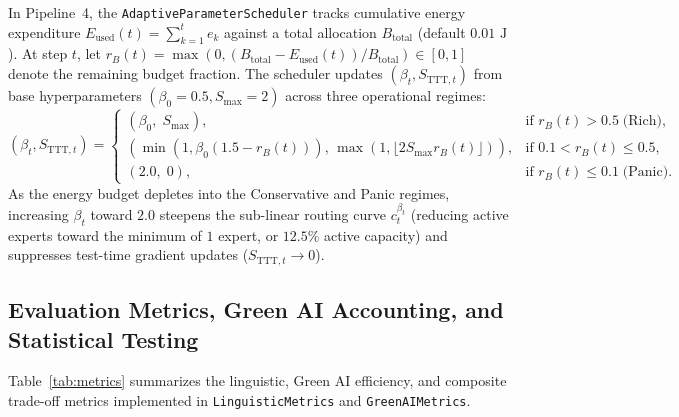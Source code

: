 \documentclass{interact}
\begin{document}
In Pipeline~4, the \texttt{AdaptiveParameterScheduler} tracks cumulative energy expenditure $E_{\text{used}}(t) = \sum_{k=1}^{t} e_k$ against a total allocation $B_{\text{total}}$ (default $0.01\text{ J}$). At step $t$, let $r_B(t) = \max(0, (B_{\text{total}} - E_{\text{used}}(t)) / B_{\text{total}}) \in [0, 1]$ denote the remaining budget fraction. The scheduler updates $(\beta_t, S_{\text{TTT},t})$ from base hyperparameters $(\beta_0 = 0.5, S_{\max} = 2)$ across three operational regimes:
\begin{equation}
    (\beta_t, S_{\text{TTT},t}) = \begin{cases}
        \left(\beta_0, \; S_{\max}\right),                                                           & \text{if } r_B(t) > 0.5 \;\text{(Rich)},    \\[4pt]
        \left(\min(1, \beta_0 (1.5 - r_B(t))), \, \max(1, \lfloor 2 S_{\max} r_B(t) \rfloor)\right), & \text{if } 0.1 < r_B(t) \le 0.5,            \\[4pt]
        \left(2.0, \; 0\right),                                                                      & \text{if } r_B(t) \le 0.1 \;\text{(Panic)}.
    \end{cases}
    \label{eq:scheduler_regimes}
\end{equation}
As the energy budget depletes into the Conservative and Panic regimes, increasing $\beta_t$ toward $2.0$ steepens the sub-linear routing curve $c_t^{\beta_t}$ (reducing active experts toward the minimum of $1$ expert, or $12.5\%$ active capacity) and suppresses test-time gradient updates ($S_{\text{TTT},t} \to 0$).

\subsection{Evaluation Metrics, Green AI Accounting, and Statistical Testing}
\label{subsec:metrics}

Table~\ref{tab:metrics} summarizes the linguistic, Green AI efficiency, and composite trade-off metrics implemented in \texttt{LinguisticMetrics} and \texttt{GreenAIMetrics}.
\end{document}
